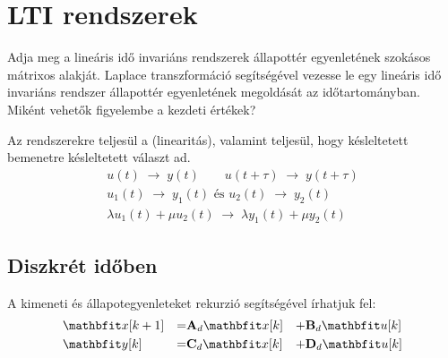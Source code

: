 \documentclass[../main.tex]{subfiles}
\begin{document}
\section{LTI rendszerek}

\begin{fulltheorem}
  Adja meg a lineáris idő invariáns rendszerek állapottér egyenletének
  szokásos mátrixos alakját. Laplace transzformáció segítségével vezesse le
  egy lineáris idő invariáns rendszer állapottér egyenletének megoldását az
  időtartományban. Miként vehetők figyelembe a kezdeti értékek?
\end{fulltheorem}

Az  rendszerekre teljesül a  (linearitás),
valamint teljesül, hogy késleltetett bemenetre késleltetett választ ad.
\begin{gather*}
  u(t) \; \rightarrow \; y(t)
  \qquad
  u(t + \tau) \; \rightarrow \; y(t + \tau)
  \\[2mm]
  u_1(t) \;\rightarrow\; y_1(t)
  \text{ és }
  u_2(t) \;\rightarrow\; y_2(t)
  \\
  \lambda u_1(t) + \mu u_2(t)
  \;\rightarrow\;
  \lambda y_1(t) + \mu y_2(t)
\end{gather*}

\subsection{Diszkrét időben}

A kimeneti és állapotegyenleteket rekurzió segítségével írhatjuk fel:
\begin{alignat*}{9}
   & \rvec x [k+1] & = & \rmat A_d \rvec x[k] & + & \rmat B_d \rvec u[k] \\
   & \rvec y [k]   & = & \rmat C_d \rvec x[k] & + & \rmat D_d \rvec u[k]
\end{alignat*}
\end{document}

